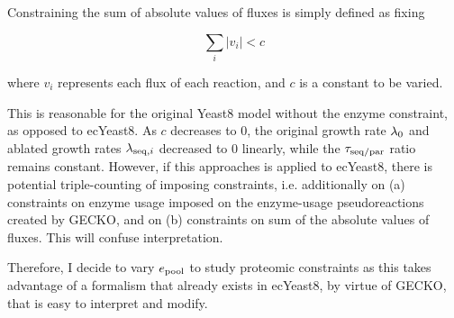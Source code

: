 Constraining the sum of absolute values of fluxes is simply defined as fixing

\begin{equation}
  \sum_{i} |v_{i}| < c
  \label{eq:model-constrain-sumfluxes}
\end{equation}

where $v_{i}$ represents each flux of each reaction, and $c$ is a constant to be varied.

This is reasonable for the original Yeast8 model without the enzyme constraint, as opposed to ecYeast8.
As $c$ decreases to 0, the original growth rate $\lambda_{0}$ and ablated growth rates $\lambda_{\mathrm{seq},i}$ decreased to 0 linearly, while the $\tau_{\mathrm{seq}/\mathrm{par}}$ ratio remains constant.
However, if this approaches is applied to ecYeast8,
there is potential triple-counting of imposing constraints, i.e.\: additionally on
(a) constraints on enzyme usage imposed on the enzyme-usage pseudoreactions created by GECKO, and on
(b) constraints on sum of the absolute values of fluxes.
This will confuse interpretation.

Therefore, I decide to vary $e_{\mathrm{pool}}$ to study proteomic constraints as this takes advantage of a formalism that already exists in ecYeast8, by virtue of GECKO, that is easy to interpret and modify.


